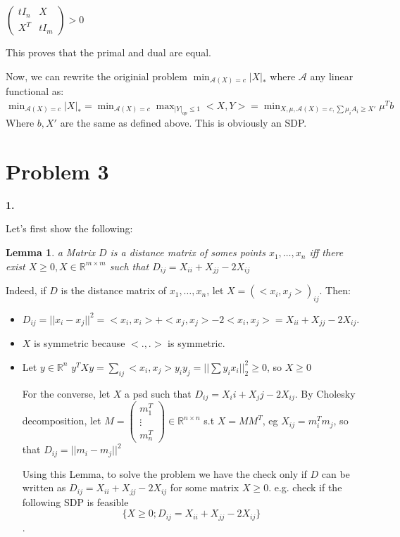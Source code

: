 \documentclass[11pt]{article}
\newtheorem{lemma}[theorem]{Lemma}
\begin{document}
\(\begin{pmatrix}tI_n&X\\X^T&tI_m\end{pmatrix} > 0\)


This proves that the primal and dual are equal.

Now, we can rewrite the originial problem \(\min_{\mathcal A(X) = c} |X|_*\) where \(\mathcal A\) any linear functional as:
\(\min_{\mathcal A(X) = c} |X|_* = \min_{\mathcal A(X) = c} \max_{|Y|_{op} \le 1} <X, Y> =  \min_{X, \mu, \mathcal A(X) = c, \sum \mu_i A_i \ge X'} \mu^T b\)
Where \(b, X'\) are the same as defined above. This is obviously an SDP.

\section{Problem 3}
\label{sec:orgheadline4}

\textbf{1.}

Let's first show the following:
\begin{lemma}
a Matrix \(D\) is a distance matrix of somes points \(x_1, \ldots, x_n\) iff there exist \(X \ge 0, X \in \mathbb R^{m \times m}\) such that \(D_{ij} = X_{ii} + X_{jj} - 2X_{ij}\) 
\end{lemma}
Indeed, if \(D\) is the distance matrix of \(x_1, \ldots, x_n\), let \(X = (<x_i, x_j>)_{ij}\). Then:
\begin{itemize}
\item \(D_{ij} = ||x_i - x_j||^2 = <x_i, x_i> + <x_j, x_j> - 2 <x_i, x_j> = X_{ii} + X_{jj} - 2 X_{ij}\).
\item \(X\) is symmetric because \(<.,.>\) is symmetric.
\item Let \(y \in \mathbb R^n\)  \(y^TXy = \sum_{ij} <x_i, x_j> y_iy_j = ||\sum y_i x_i||_2^2 \ge 0\), so \(X \ge 0\)

For the converse, let \(X\) a psd such that \(D_{ij} = X_ii + X_jj - 2X_{ij}\). By Cholesky decomposition, let \(M = \begin{pmatrix}m_1^T\\\vdots\\m_n^T\end{pmatrix} \in \mathbb R^{n \times n}\) s.t \(X = MM^T\), eg \(X_{ij} =m_i^Tm_j\), so that \(D_{ij} = ||m_i - m_j||^2\)

Using this Lemma, to solve the problem we have the check only if \(D\) can be written as  \(D_{ij} = X_{ii} + X_{jj} - 2X_{ij}\) for some matrix \(X \ge 0\).
e.g. check if the following SDP is feasible $$\{X \ge 0; D_{ij} = X_{ii} + X_{jj} - 2X_{ij}\}$$.
\end{itemize}
\end{document}
